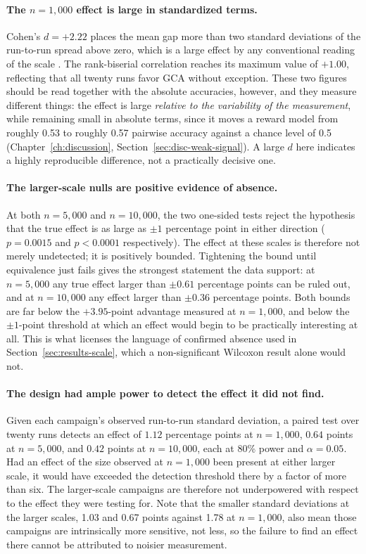 \paragraph{The $n=1{,}000$ effect is large in standardized terms.} Cohen's
$d=+2.22$ places the mean gap more than two standard deviations of the
run-to-run spread above zero, which is a large effect by any conventional
reading of the scale \citep{cohen1988statistical}. The rank-biserial
correlation reaches its maximum value of $+1.00$, reflecting that all twenty
runs favor GCA without exception. These two figures should be read together
with the absolute accuracies, however, and they measure different things: the
effect is large \emph{relative to the variability of the measurement}, while
remaining small in absolute terms, since it moves a reward model from roughly
0.53 to roughly 0.57 pairwise accuracy against a chance level of 0.5
(Chapter~\ref{ch:discussion}, Section~\ref{sec:disc-weak-signal}). A large $d$
here indicates a highly reproducible difference, not a practically decisive one.

\paragraph{The larger-scale nulls are positive evidence of absence.} At both
$n=5{,}000$ and $n=10{,}000$, the two one-sided tests reject the hypothesis that
the true effect is as large as $\pm1$ percentage point in either direction
($p=0.0015$ and $p<0.0001$ respectively). The effect at these scales is
therefore not merely undetected; it is positively bounded. Tightening the bound
until equivalence just fails gives the strongest statement the data support: at
$n=5{,}000$ any true effect larger than $\pm0.61$ percentage points can be
ruled out, and at $n=10{,}000$ any effect larger than $\pm0.36$ percentage
points. Both bounds are far below the $+3.95$-point advantage measured at
$n=1{,}000$, and below the $\pm1$-point threshold at which an effect would begin
to be practically interesting at all. This is what licenses the language of
confirmed absence used in Section~\ref{sec:results-scale}, which a
non-significant Wilcoxon result alone would not.

\paragraph{The design had ample power to detect the effect it did not find.}
Given each campaign's observed run-to-run standard deviation, a paired test over
twenty runs detects an effect of $1.12$ percentage points at $n=1{,}000$,
$0.64$ points at $n=5{,}000$, and $0.42$ points at $n=10{,}000$, each at 80\%
power and $\alpha=0.05$. Had an effect of the size observed at $n=1{,}000$ been
present at either larger scale, it would have exceeded the detection threshold
there by a factor of more than six. The larger-scale campaigns are therefore not
underpowered with respect to the effect they were testing for. Note that the
smaller standard deviations at the larger scales, 1.03 and 0.67
points against 1.78 at $n=1{,}000$, also mean those campaigns are
intrinsically more sensitive, not less, so the failure to find an effect there
cannot be attributed to noisier measurement.

